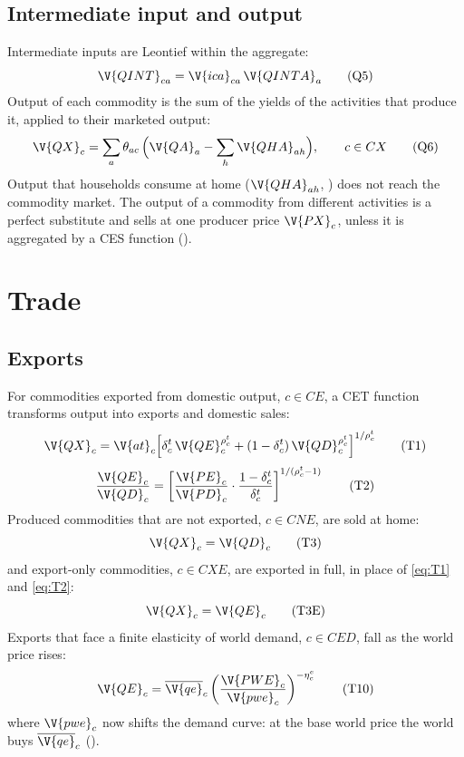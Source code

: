 \subsection{Intermediate input and output}

Intermediate inputs are Leontief within the aggregate:
\begin{equation}
\V{QINT}_{ca} = \V{ica}_{ca}\,\V{QINTA}_a
\tag{Q5}\label{eq:Q5}
\end{equation}
Output of each commodity is the sum of the yields of the activities that
produce it, applied to their marketed output:
\begin{equation}
\V{QX}_c = \sum_a \theta_{ac}\,\Bigl(\V{QA}_a - \sum_h \V{QHA}_{ah}\Bigr), \qquad c \in CX
\tag{Q6}\label{eq:Q6}
\end{equation}
Output that households consume at home ($\V{QHA}_{ah}$, )
does not reach the commodity market. The output of a commodity from different
activities is a perfect substitute and sells at one producer price
$\V{PX}_c$, unless it is aggregated by a CES function
().

\section{Trade}\label{sec:trade}

\subsection{Exports}

For commodities exported from domestic output, $c \in CE$, a CET function
transforms output into exports and domestic sales:
\begin{equation}
\V{QX}_c = \V{at}_c\Bigl[\delta^t_c\,\V{QE}_c^{\rho^t_c} + (1 - \delta^t_c)\,\V{QD}_c^{\rho^t_c}\Bigr]^{1/\rho^t_c}
\tag{T1}\label{eq:T1}
\end{equation}
\begin{equation}
\frac{\V{QE}_c}{\V{QD}_c} = \left[\frac{\V{PE}_c}{\V{PD}_c}\cdot\frac{1 - \delta^t_c}{\delta^t_c}\right]^{1/(\rho^t_c - 1)}
\tag{T2}\label{eq:T2}
\end{equation}
Produced commodities that are not exported, $c \in CNE$, are sold at home:
\begin{equation}
\V{QX}_c = \V{QD}_c
\tag{T3}\label{eq:T3}
\end{equation}
and export-only commodities, $c \in CXE$, are exported in full, in place of
\eqref{eq:T1} and \eqref{eq:T2}:
\begin{equation}
\V{QX}_c = \V{QE}_c
\tag{T3E}\label{eq:T3E}
\end{equation}
Exports that face a finite elasticity of world demand, $c \in CED$, fall as
the world price rises:
\begin{equation}
\V{QE}_c = \overline{\V{qe}}_c \left(\frac{\V{PWE}_c}{\V{pwe}_c}\right)^{-\eta^e_c}
\tag{T10}\label{eq:T10}
\end{equation}
where $\V{pwe}_c$ now shifts the demand curve: at the base world price the
world buys $\overline{\V{qe}}_c$ ().

